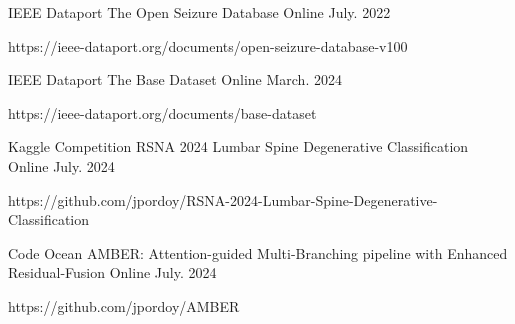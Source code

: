 
\begin{cventries}
  \cventry
    {IEEE Dataport} %
    {The Open Seizure Database} %
    {Online} %
    {July. 2022} %
    {
    \begin{cvitems} %
      \item {https://ieee-dataport.org/documents/open-seizure-database-v100}
    \end{cvitems}
    }
    \vspace{5pt}

  \cventry
  {IEEE Dataport} %
  {The Base Dataset} %
    {Online} %
    {March. 2024} %
    {
    \begin{cvitems} %
      \item {https://ieee-dataport.org/documents/base-dataset}
    \end{cvitems}
    }
    \vspace{5pt}


  \cventry
  {Kaggle Competition} %
  {RSNA 2024 Lumbar Spine Degenerative Classification} %
    {Online} %
    {July. 2024} %
    {
    \begin{cvitems} %
      \item {https://github.com/jpordoy/RSNA-2024-Lumbar-Spine-Degenerative-Classification}
    \end{cvitems}
    }
    \vspace{5pt}



  \cventry
  {Code Ocean} %
  {AMBER: Attention-guided Multi-Branching pipeline with Enhanced Residual-Fusion} %
    {Online} %
    {July. 2024} %
    {
    \begin{cvitems} %
      \item {https://github.com/jpordoy/AMBER}
    \end{cvitems}
    }
    \vspace{5pt}





\end{cventries}